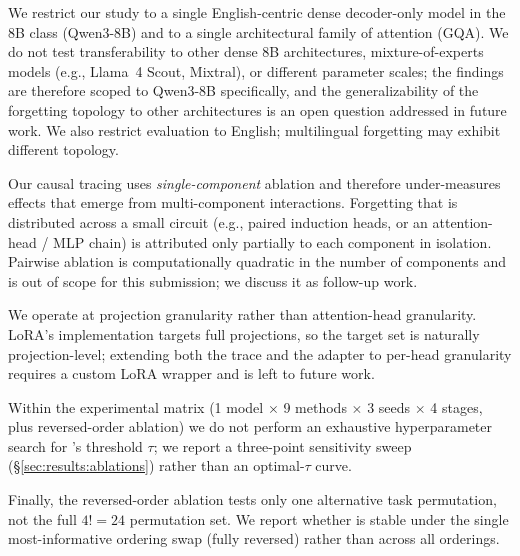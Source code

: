 \label{sec:limitations}

We restrict our study to a single English-centric dense decoder-only model in the $8$B class (Qwen3-8B) and to a single architectural family of attention (GQA). We do not test transferability to other dense 8B architectures, mixture-of-experts models (e.g., Llama~4 Scout, Mixtral), or different parameter scales; the findings are therefore scoped to Qwen3-8B specifically, and the generalizability of the forgetting topology to other architectures is an open question addressed in future work. We also restrict evaluation to English; multilingual forgetting may exhibit different topology.

Our causal tracing uses \textit{single-component} ablation and therefore under-measures effects that emerge from multi-component interactions. Forgetting that is distributed across a small circuit (e.g., paired induction heads, or an attention-head / MLP chain) is attributed only partially to each component in isolation. Pairwise ablation is computationally quadratic in the number of components and is out of scope for this submission; we discuss it as follow-up work.

We operate at projection granularity rather than attention-head granularity. LoRA's implementation targets full projections, so the \tglora{} target set is naturally projection-level; extending both the trace and the adapter to per-head granularity requires a custom LoRA wrapper and is left to future work.

Within the experimental matrix (1 model $\times$ 9 methods $\times$ 3 seeds $\times$ 4 stages, plus reversed-order ablation) we do not perform an exhaustive hyperparameter search for \tglora{}'s threshold $\tau$; we report a three-point sensitivity sweep (\S\ref{sec:results:ablations}) rather than an optimal-$\tau$ curve.

Finally, the reversed-order ablation tests only one alternative task permutation, not the full $4! = 24$ permutation set. We report whether \fvs{} is stable under the single most-informative ordering swap (fully reversed) rather than across all orderings.
